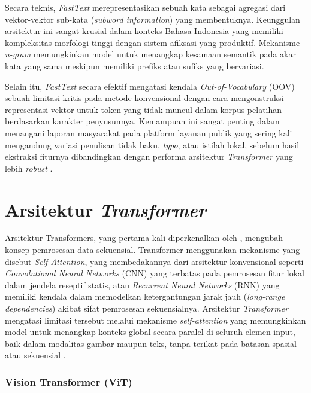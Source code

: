 Secara teknis, \textit{FastText} merepresentasikan sebuah kata sebagai agregasi dari vektor-vektor sub-kata (\textit{subword information}) yang membentuknya. Keunggulan arsitektur ini sangat krusial dalam konteks Bahasa Indonesia yang memiliki kompleksitas morfologi tinggi dengan sistem afiksasi yang produktif. Mekanisme \textit{n-gram} memungkinkan model untuk menangkap kesamaan semantik pada akar kata yang sama meskipun memiliki prefiks atau sufiks yang bervariasi. 

Selain itu, \textit{FastText} secara efektif mengatasi kendala \textit{Out-of-Vocabulary} (OOV) sebuah limitasi kritis pada metode konvensional dengan cara mengonstruksi representasi vektor untuk token yang tidak muncul dalam korpus pelatihan berdasarkan karakter penyusunnya. Kemampuan ini sangat penting dalam menangani laporan masyarakat pada platform layanan publik yang sering kali mengandung variasi penulisan tidak baku, \textit{typo}, atau istilah lokal, sebelum hasil ekstraksi fiturnya dibandingkan dengan performa arsitektur \textit{Transformer} yang lebih \textit{robust} \citep{vaswaniAttentionAllYou2023}.

\section{Arsitektur \textit{Transformer}}
Arsitektur Transformers, yang pertama kali diperkenalkan oleh \citep{vaswaniAttentionAllYou2023}, mengubah 
konsep pemrosesan data sekuensial. Transformer menggunakan mekanisme yang disebut \textit{Self-Attention}, yang membedakannya dari arsitektur konvensional seperti \textit{Convolutional Neural Networks} (CNN) yang terbatas pada pemrosesan fitur lokal dalam jendela reseptif statis, atau \textit{Recurrent Neural Networks} (RNN) yang memiliki kendala dalam memodelkan ketergantungan jarak jauh (\textit{long-range dependencies}) akibat sifat pemrosesan sekuensialnya. Arsitektur \textit{Transformer} mengatasi limitasi tersebut melalui mekanisme \textit{self-attention} yang memungkinkan model untuk menangkap konteks global secara paralel di seluruh elemen input, baik dalam modalitas gambar  maupun teks, tanpa terikat pada batasan spasial atau sekuensial \citep{vaswaniAttentionAllYou2023}.


\subsubsection{Vision Transformer (ViT)}

